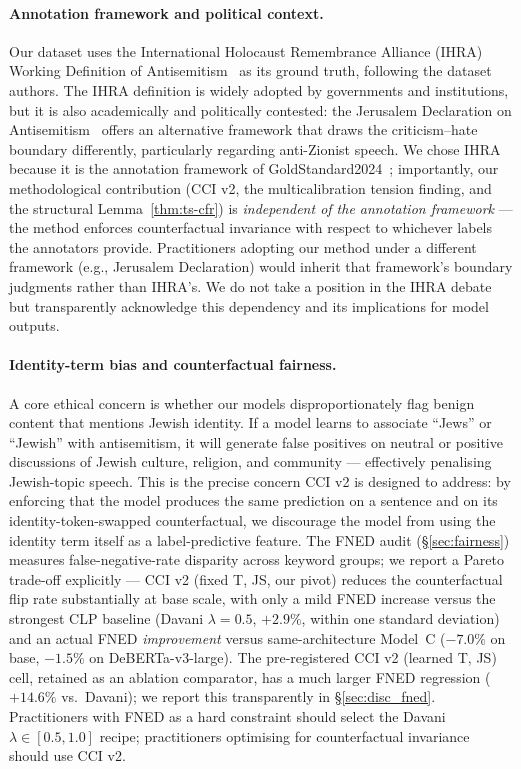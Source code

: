 \documentclass[10pt,a4paper]{article}
\begin{document}
\paragraph{Annotation framework and political context.}
Our dataset uses the International Holocaust Remembrance Alliance (IHRA) Working Definition of Antisemitism~\citep{ihra2016working} as its ground truth, following the dataset authors. The IHRA definition is widely adopted by governments and institutions, but it is also academically and politically contested: the Jerusalem Declaration on Antisemitism~\citep{jd2021jerusalem} offers an alternative framework that draws the criticism--hate boundary differently, particularly regarding anti-Zionist speech. We chose IHRA because it is the annotation framework of GoldStandard2024~\citep{jikeli2024goldstandard}; importantly, our methodological contribution (CCI v2, the multicalibration tension finding, and the structural Lemma~\ref{thm:ts-cfr}) is \emph{independent of the annotation framework} --- the method enforces counterfactual invariance with respect to whichever labels the annotators provide. Practitioners adopting our method under a different framework (e.g., Jerusalem Declaration) would inherit that framework's boundary judgments rather than IHRA's. We do not take a position in the IHRA debate but transparently acknowledge this dependency and its implications for model outputs.

\paragraph{Identity-term bias and counterfactual fairness.}
A core ethical concern is whether our models disproportionately flag benign content that mentions Jewish identity. If a model learns to associate ``Jews'' or ``Jewish'' with antisemitism, it will generate false positives on neutral or positive discussions of Jewish culture, religion, and community --- effectively penalising Jewish-topic speech. This is the precise concern CCI v2 is designed to address: by enforcing that the model produces the same prediction on a sentence and on its identity-token-swapped counterfactual, we discourage the model from using the identity term itself as a label-predictive feature. The FNED audit (\S\ref{sec:fairness}) measures false-negative-rate disparity across keyword groups; we report a Pareto trade-off explicitly --- CCI v2 (fixed T, JS, our pivot) reduces the counterfactual flip rate substantially at base scale, with only a mild FNED increase versus the strongest CLP baseline (Davani $\lambda=0.5$, $+2.9\%$, within one standard deviation) and an actual FNED \emph{improvement} versus same-architecture Model~C ($-7.0\%$ on base, $-1.5\%$ on DeBERTa-v3-large). The pre-registered CCI v2 (learned T, JS) cell, retained as an ablation comparator, has a much larger FNED regression ($+14.6\%$ vs.\ Davani); we report this transparently in \S\ref{sec:disc_fned}. Practitioners with FNED as a hard constraint should select the Davani $\lambda \in [0.5, 1.0]$ recipe; practitioners optimising for counterfactual invariance should use CCI v2.
\end{document}
